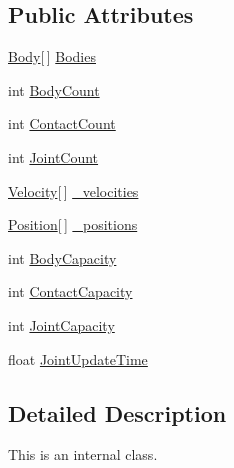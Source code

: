 \subsection*{Public Attributes}
\begin{DoxyCompactItemize}
\item 
\hyperlink{class_farseer_physics_1_1_dynamics_1_1_body}{Body}\mbox{[}$\,$\mbox{]} \hyperlink{class_farseer_physics_1_1_dynamics_1_1_island_a87e3715b146ddd01f6fde0512bb5028c}{Bodies}
\item 
int \hyperlink{class_farseer_physics_1_1_dynamics_1_1_island_ab656c7f4c1d9383158705990f7e5bbf8}{Body\+Count}
\item 
int \hyperlink{class_farseer_physics_1_1_dynamics_1_1_island_adf72a4cd3887cff4cfec900e6f8d83fb}{Contact\+Count}
\item 
int \hyperlink{class_farseer_physics_1_1_dynamics_1_1_island_aad8495aea85db4a5c1378dfe6339149a}{Joint\+Count}
\item 
\hyperlink{struct_farseer_physics_1_1_dynamics_1_1_velocity}{Velocity}\mbox{[}$\,$\mbox{]} \hyperlink{class_farseer_physics_1_1_dynamics_1_1_island_ac72878baf1c6f3aca15eec1e56ee6ae4}{\+\_\+velocities}
\item 
\hyperlink{struct_farseer_physics_1_1_dynamics_1_1_position}{Position}\mbox{[}$\,$\mbox{]} \hyperlink{class_farseer_physics_1_1_dynamics_1_1_island_a89ac95786b6c4aa99d1b5669959c45ac}{\+\_\+positions}
\item 
int \hyperlink{class_farseer_physics_1_1_dynamics_1_1_island_abaaf7b2f1dfb4677f4e08d16ff36de9a}{Body\+Capacity}
\item 
int \hyperlink{class_farseer_physics_1_1_dynamics_1_1_island_ad5f5d08d2b3649a8cfe4fab239a67b0e}{Contact\+Capacity}
\item 
int \hyperlink{class_farseer_physics_1_1_dynamics_1_1_island_a0b39f39289b19a32092cfe076398e964}{Joint\+Capacity}
\item 
float \hyperlink{class_farseer_physics_1_1_dynamics_1_1_island_a863eaf6d13c23e93c06d7495d3f8aceb}{Joint\+Update\+Time}
\end{DoxyCompactItemize}


\subsection{Detailed Description}
This is an internal class. 



